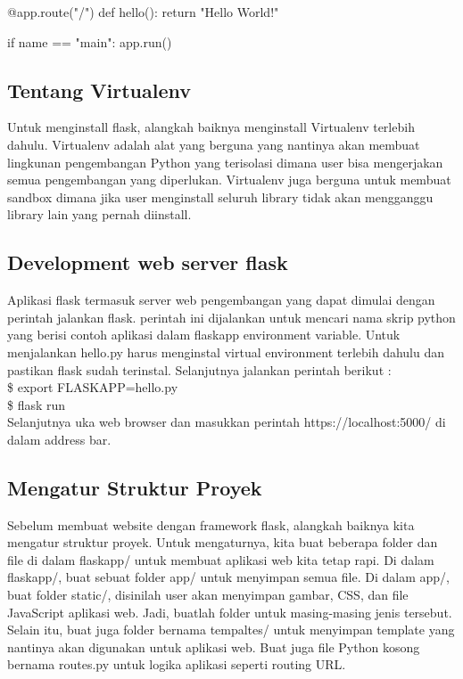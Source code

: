 \documentclass[12pt,a4paper]{article}
\begin{document}
@app.route("/")
def hello():
    return "Hello World!"

if name == "main":
    app.run()
\subsection{Tentang Virtualenv}
Untuk menginstall flask, alangkah baiknya menginstall Virtualenv terlebih dahulu. Virtualenv adalah alat yang berguna yang nantinya akan membuat lingkunan pengembangan Python yang terisolasi dimana user bisa mengerjakan semua pengembangan yang diperlukan. Virtualenv juga berguna untuk membuat sandbox dimana jika user menginstall seluruh library tidak akan mengganggu library lain yang pernah diinstall.
\subsection{Development web server flask}
Aplikasi flask termasuk server web pengembangan yang dapat dimulai dengan perintah jalankan flask. perintah ini dijalankan  untuk mencari nama skrip python yang berisi contoh aplikasi dalam flaskapp environment variable.
Untuk menjalankan hello.py harus menginstal virtual environment terlebih dahulu dan pastikan flask sudah terinstal. Selanjutnya jalankan perintah berikut :\\
\$ export FLASKAPP=hello.py\\
\$ flask run\\
Selanjutnya uka web browser dan masukkan perintah https://localhost:5000/ di dalam address bar.

\subsection{Mengatur Struktur Proyek}
Sebelum membuat website dengan framework flask, alangkah baiknya kita mengatur struktur proyek. Untuk mengaturnya, kita buat beberapa folder dan file di dalam flaskapp/ untuk membuat aplikasi web kita tetap rapi. Di dalam flaskapp/, buat sebuat folder app/ untuk menyimpan semua file. Di dalam app/, buat folder static/, disinilah user akan menyimpan gambar, CSS, dan file JavaScript aplikasi web. Jadi, buatlah folder untuk masing-masing jenis tersebut. Selain itu, buat juga folder bernama tempaltes/ untuk menyimpan template yang nantinya akan digunakan untuk aplikasi web. Buat juga file Python kosong bernama routes.py untuk logika aplikasi seperti routing URL.
\end{document}
